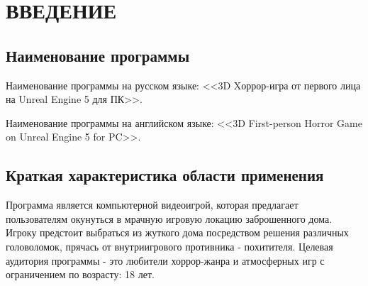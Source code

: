 \section{ВВЕДЕНИЕ}

\subsection{Наименование программы}

Наименование программы на русском языке: <<3D Xоррор-игра от первого лица на Unreal Engine 5 для ПК>>.

Наименование программы на английском языке: <<3D First-person Horror Game on Unreal Engine 5 for PC>>.

\subsection{Краткая характеристика области применения}

Программа является компьютерной видеоигрой, которая предлагает пользователям окунуться в мрачную игровую локацию заброшенного дома.  
Игроку предстоит выбраться из жуткого дома посредством решения различных головоломок, прячась от внутриигрового противника - похитителя.
Целевая аудитория программы - это любители хоррор-жанра и атмосферных игр с ограничением по возрасту: 18 лет.
